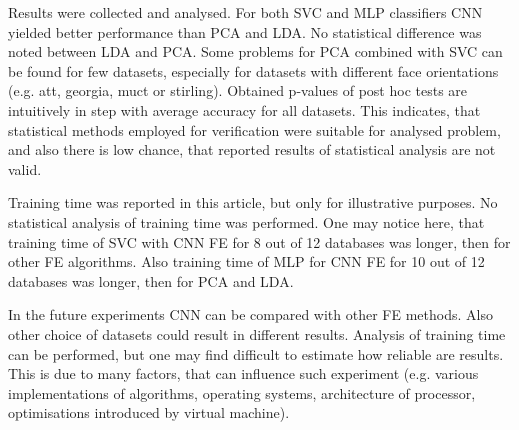 \documentclass[a4paper, 10 pt, journal]{ieeeconf}
\begin{document}
Results were collected and analysed. For both SVC and MLP classifiers CNN yielded better performance than PCA and LDA. No statistical difference was noted between LDA and PCA. Some problems for PCA combined with SVC can be found for few datasets, especially for datasets with different face orientations (e.g. att, georgia, muct or stirling). Obtained p-values of post hoc tests are intuitively in step with average accuracy for all datasets. This indicates, that statistical methods employed for verification were suitable for analysed problem, and also there is low chance, that reported results of statistical analysis are not valid.

Training time was reported in this article, but only for illustrative purposes. No statistical analysis of training time was performed. One may notice here, that training time of SVC with CNN FE for 8 out of 12 databases was longer, then for other FE algorithms. Also training time of MLP for CNN FE for 10 out of 12 databases was longer, then for PCA and LDA.

In the future experiments CNN can be compared with other FE methods. Also other choice of datasets could result in different results. Analysis of training time can be performed, but one may find difficult to estimate how reliable are results. This is due to many factors, that can influence such experiment (e.g. various implementations of algorithms, operating systems, architecture of processor, optimisations introduced by virtual machine). 




\end{document}
